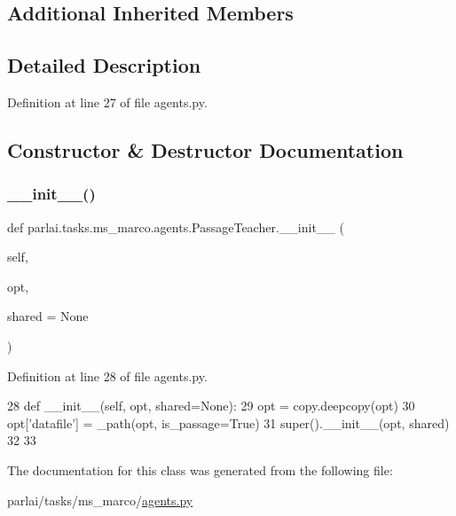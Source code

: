 \subsection*{Additional Inherited Members}


\subsection{Detailed Description}


Definition at line 27 of file agents.\+py.



\subsection{Constructor \& Destructor Documentation}
\mbox{\label{classparlai_1_1tasks_1_1ms__marco_1_1agents_1_1PassageTeacher_a94976bd31fa3b9da0ea1c7625b22c382}} 
\subsubsection{\texorpdfstring{\+\_\+\+\_\+init\+\_\+\+\_\+()}{\_\_init\_\_()}}
{\footnotesize\ttfamily def parlai.\+tasks.\+ms\+\_\+marco.\+agents.\+Passage\+Teacher.\+\_\+\+\_\+init\+\_\+\+\_\+ (\begin{DoxyParamCaption}\item[{}]{self,  }\item[{}]{opt,  }\item[{}]{shared = {\ttfamily None} }\end{DoxyParamCaption})}



Definition at line 28 of file agents.\+py.


\begin{DoxyCode}
28     \textcolor{keyword}{def }\_\_init\_\_(self, opt, shared=None):
29         opt = copy.deepcopy(opt)
30         opt[\textcolor{stringliteral}{'datafile'}] = \_path(opt, is\_passage=\textcolor{keyword}{True})
31         super().\_\_init\_\_(opt, shared)
32 
33 
\end{DoxyCode}


The documentation for this class was generated from the following file\+:\begin{DoxyCompactItemize}
\item 
parlai/tasks/ms\+\_\+marco/\hyperlink{parlai_2tasks_2ms__marco_2agents_8py}{agents.\+py}\end{DoxyCompactItemize}
